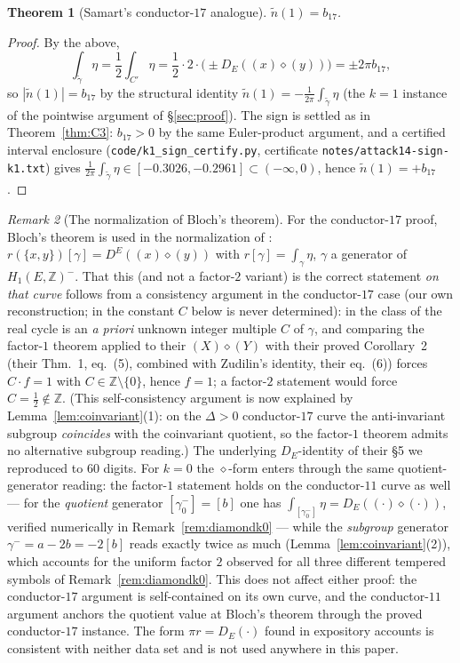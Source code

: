 \documentclass[preprint,12pt]{elsarticle}
\newtheorem{theorem}{Theorem}[section]
\theoremstyle{definition}
\theoremstyle{remark}
\newtheorem{remark}[theorem]{Remark}
\newcommand{\Z}{\mathbb{Z}}
\begin{document}
\begin{theorem}[Samart's conductor-$17$ analogue]\label{thm:k1}
$\tilde n(1)=b_{17}$.
\end{theorem}

\begin{proof}
By the above,
\[
  \int_{\tilde\gamma}\eta=\frac12\int_{C'}\eta
  =\frac12\cdot 2\cdot\big(\pm D_E((x)\diamond(y))\big)=\pm 2\pi b_{17},
\]
so $|\tilde n(1)|=b_{17}$ by the
structural identity $\tilde n(1)=-\frac1{2\pi}\int_{\tilde\gamma}\eta$
(the $k=1$ instance of the pointwise argument of \S\ref{sec:proof}).
The sign is settled as in Theorem~\ref{thm:C3}: $b_{17}>0$ by the same
Euler-product argument, and a certified interval enclosure
(\texttt{code/k1\_sign\_certify.py}, certificate
\texttt{notes/attack14-sign-k1.txt}) gives
$\frac1{2\pi}\int_{\tilde\gamma}\eta\in[-0.3026,-0.2961]\subset(-\infty,0)$,
hence $\tilde n(1)=+b_{17}$.
\end{proof}

\begin{remark}[The normalization of Bloch's theorem]\label{rem:normalisation}
For the conductor-$17$ proof, Bloch's theorem is used in the normalization
of \cite[Thm.~6]{LalinRam}: $r(\{x,y\})[\gamma]=D^E((x)\diamond(y))$ with
$r[\gamma]=\int_\gamma\eta$, $\gamma$ a generator of $H_1(E,\Z)^-$. That
this (and not a factor-$2$ variant) is the correct statement \emph{on that
curve} follows from a
consistency argument in the conductor-$17$ case (our own reconstruction;
in \cite{LalinRam} the constant $C$ below is never determined): in
\cite[\S7]{LalinRam} the class of the real cycle is an \emph{a priori}
unknown integer multiple $C$ of $\gamma$, and comparing the factor-$1$
theorem applied to their $(X)\diamond(Y)$ with their proved Corollary~2
(their Thm.~1, eq.~(5), combined with Zudilin's identity, their eq.~(6))
forces $C\cdot f=1$ with $C\in\Z\setminus\{0\}$, hence $f=1$; a factor-$2$
statement would force $C=\tfrac12\notin\Z$. (This self-consistency argument
is now explained by Lemma~\ref{lem:coinvariant}(1): on the $\Delta>0$
conductor-$17$ curve the anti-invariant subgroup \emph{coincides} with the
coinvariant quotient, so the factor-$1$ theorem admits no alternative
subgroup reading.) The underlying $D_E$-identity of
their \S5 we reproduced to $60$ digits. For $k=0$ the $\diamond$-form enters
through the same quotient-generator reading: the factor-$1$ statement holds
on the conductor-$11$ curve as well --- for the \emph{quotient} generator
$[\gamma^-_0]=[b]$ one has
$\int_{[\gamma^-_0]}\eta=D_E((\cdot)\diamond(\cdot))$, verified numerically
in Remark~\ref{rem:diamondk0} --- while the \emph{subgroup} generator
$\gamma^-=a-2b=-2[b]$ reads exactly twice as much
(Lemma~\ref{lem:coinvariant}(2)), which accounts for the uniform factor $2$
observed for all three different tempered symbols of
Remark~\ref{rem:diamondk0}. This does
not affect either proof: the conductor-$17$ argument is
self-contained on its own curve, and the conductor-$11$ argument anchors
the quotient value at Bloch's theorem through the proved conductor-$17$
instance. The form $\pi r=D_E(\cdot)$ found in
expository accounts is consistent with neither data set and is not
used anywhere in this paper.
\end{remark}
\end{document}
